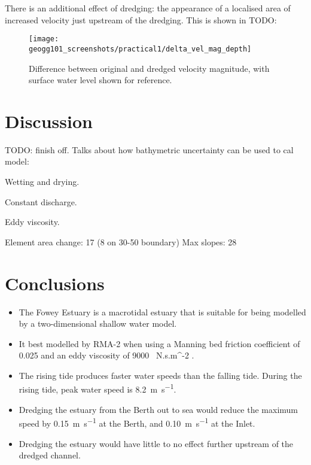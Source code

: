 \documentclass{article}
\begin{document}
There is an additional effect of dredging: the appearance of a localised area of increased velocity just upstream of the dredging. This is shown in TODO: %

\begin{figure}[!h]
    \centering
    \texttt{[image: geogg101\_screenshots/practical1/delta\_vel\_mag\_depth]}
    \caption{Difference between original and dredged velocity magnitude, with surface water level shown for reference.}
    \label{fig:delta_vel_mag_depth}
\end{figure}

\section{Discussion}

TODO: finish off. Talks about how bathymetric uncertainty can be used to cal model: \textcite{cea2012bathymetric}

Wetting and drying.

Constant discharge.

Eddy viscosity.

Element area change: 17 (8 on 30-50 boundary)
Max slopes: 28

\section{Conclusions}


\begin{itemize}
    \item The Fowey Estuary is a macrotidal estuary that is suitable for being modelled by a two-dimensional shallow water model.
    \item It best modelled by RMA-2 when using a Manning bed friction coefficient of 0.025 and an eddy viscosity of \SI{9000}{ N.s.m^{-2} }.
    \item The rising tide produces faster water speeds than the falling tide. During the rising tide, peak water speed is \SI{8.2}{m.s^{-1}}.
    \item Dredging the estuary from the Berth out to sea would reduce the maximum speed by \SI{0.15}{m.s^{-1}} at the Berth, and \SI{0.10}{m.s^{-1}} at the Inlet.
    \item Dredging the estuary would have little to no effect further upstream of the dredged channel.
\end{itemize}
\end{document}
